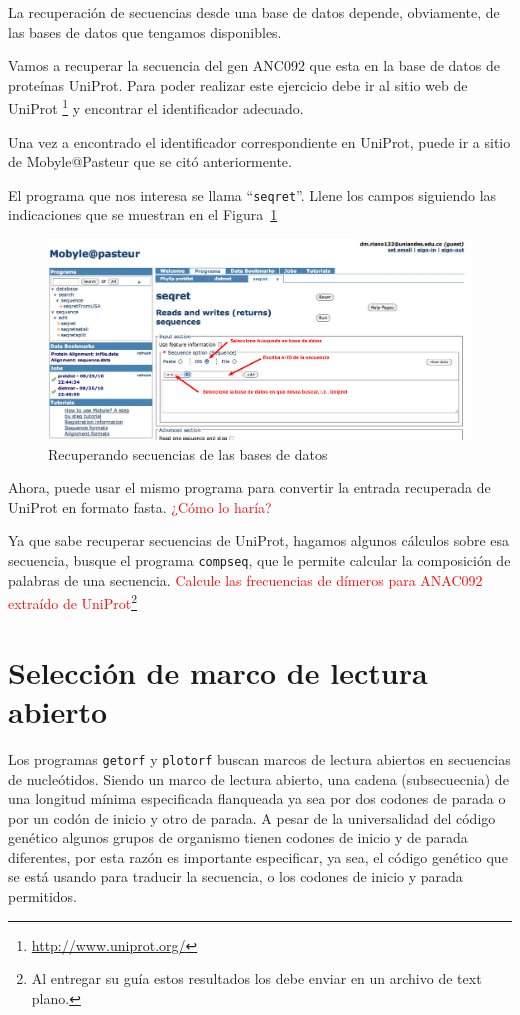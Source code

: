 \documentclass[letter,11pt]{book}
\begin{document}
La recuperación de secuencias desde una base de datos depende, obviamente, de las bases de datos que tengamos disponibles.

Vamos a recuperar la secuencia del gen ANC092 que esta en la base de datos de proteínas UniProt. Para poder realizar este ejercicio debe ir al sitio web de UniProt \footnote{\url{http://www.uniprot.org/}} y encontrar el identificador adecuado.

Una vez a encontrado el identificador correspondiente en UniProt, puede ir a sitio de Mobyle@Pasteur que se citó anteriormente.

El programa que nos interesa se llama ``\Verb+seqret+''. Llene los campos siguiendo las indicaciones que se muestran en el Figura~\ref{Seqret1}

\begin{figure}[ht]
\centering
   \includegraphics[width=17cm]{Figs/SeqRet1.png}
  \caption{\label{Seqret1}Recuperando secuencias de las bases de datos}
\end{figure}

Ahora, puede usar el mismo programa para convertir la entrada recuperada de UniProt en formato fasta. \textcolor{red}{¿Cómo lo haría?}

Ya que sabe recuperar secuencias de UniProt, hagamos algunos cálculos sobre esa secuencia, busque el programa \Verb+compseq+, que le permite calcular la composición de palabras de una secuencia. \textcolor{red}{Calcule las frecuencias de dímeros para ANAC092 extraído de UniProt}\footnote{Al entregar su guía estos resultados los debe enviar en un archivo de text plano.}

\section{Selección de marco de lectura abierto}

Los programas \Verb+getorf+ y \Verb+plotorf+ buscan marcos de lectura abiertos en secuencias de nucleótidos. Siendo un marco de lectura abierto, una cadena (subsecuecnia) de una longitud mínima especificada flanqueada ya sea por dos codones de parada o por un codón de inicio y otro de parada. A pesar de la universalidad del código genético algunos grupos de organismo tienen codones de inicio y de parada diferentes, por esta razón es importante especificar, ya sea, el código genético que se está usando para traducir la secuencia, o los codones de inicio y parada permitidos.
\end{document}
